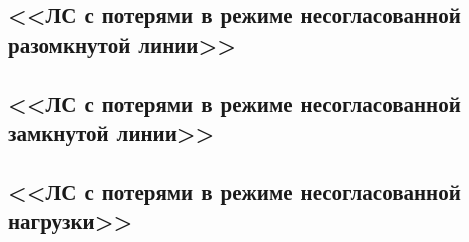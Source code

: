 \documentclass[11pt]{article}
\begin{document}
\subsection{<<ЛС с потерями в режиме несогласованной разомкнутой линии>>}
\subsection{<<ЛС с потерями в режиме несогласованной замкнутой линии>>}
\subsection{<<ЛС с потерями в режиме несогласованной нагрузки>>}
\end{document}
